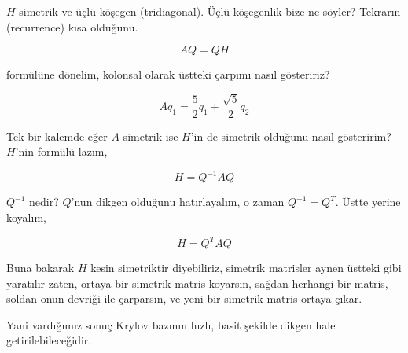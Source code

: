 \documentclass[12pt,fleqn]{article}\usepackage{../../common}
\begin{document}
$H$ simetrik ve üçlü köşegen (tridiagonal). Üçlü köşegenlik bize ne
söyler?  Tekrarın (recurrence) kısa olduğunu.

$$ AQ = QH $$

formülüne dönelim, kolonsal olarak üstteki çarpımı nasıl gösteririz? 

$$ Aq_1  = \frac{ 5}{2}q_1  + \frac{ \sqrt{ 5}}{2} q_2 $$

Tek bir kalemde eğer $A$ simetrik ise $H$'in de simetrik olduğunu nasıl
gösteririm? $H$'nin formülü lazım, 

$$ H = Q^{-1}AQ $$

$Q^{-1}$ nedir? $Q$'nun dikgen olduğunu hatırlayalım, o zaman 
$Q^{-1} = Q^T$. Üstte yerine koyalım,

$$ H = Q^{T}AQ $$ 

Buna bakarak $H$ kesin simetriktir diyebiliriz, simetrik matrisler aynen
üstteki gibi yaratılır zaten, ortaya bir simetrik matris koyarsın, sağdan
herhangi bir matris, soldan onun devriği ile çarparsın, ve yeni bir
simetrik matris ortaya çıkar. 

Yani vardığımız sonuç Krylov bazının hızlı, basit şekilde dikgen hale
getirilebileceğidir.
\end{document}
